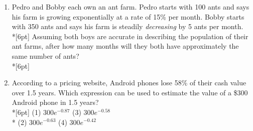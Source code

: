 \documentclass[12pt, oneside]{article}
\begin{document}
\begin{enumerate}
\item Pedro and Bobby each own an ant farm. Pedro starts with 100 ants and says his farm is growing exponentially at a rate of 15\% per month. Bobby starts with 350 ants and says his farm is steadily \textit{decreasing} by 5 ants per month.\\*[6pt]
Assuming both boys are accurate in describing the population of their ant farms, after how many months will they both have approximately the same number of ants?\\*[6pt]

\item According to a pricing website, Android phones lose 58\% of their cash value over 1.5 years. Which expression can be used to estimate the value of a \$300 Android phone in 1.5 years?\\*[6pt]
(1) $300e^{-0.87}$ \qquad (3) $300e^{-0.58}$ \\*
(2) $300e^{-0.63}$ \qquad (4) $300e^{-0.42}$


\end{enumerate}
\end{document}
